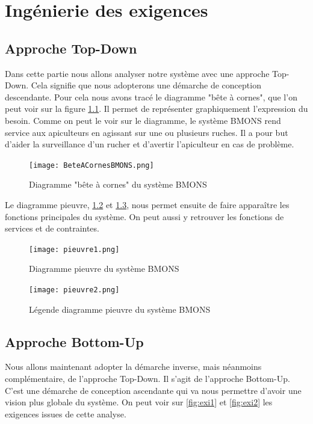 \chapter{Ingénierie des exigences}
\section{Approche Top-Down}
\vspace{1.5cm}
Dans cette partie nous allons analyser notre système avec une approche Top-Down. Cela signifie que nous adopterons une démarche de conception descendante. Pour cela nous avons tracé le diagramme "bête à cornes", que l'on peut voir sur la figure \ref{fig:beteacorne}. Il permet de représenter graphiquement l'expression du besoin. Comme on peut le voir sur le diagramme, le système BMONS rend service aux apiculteurs en agissant sur une ou plusieurs ruches. Il a pour but d'aider la surveillance d'un rucher et d'avertir l'apiculteur en cas de problème.


\begin{figure}[h!]
\centering\texttt{[image: BeteACornesBMONS.png]}
\caption{\label{fig:beteacorne} Diagramme "bête à cornes" du système BMONS}
\end{figure}

Le diagramme pieuvre, \ref{fig:diagpieuvre1} et \ref{fig:diagpieuvre2}, nous permet ensuite de faire apparaître les fonctions principales du système. On peut aussi y retrouver les fonctions de services et de contraintes.

 
\begin{figure}[h!]
\centering\texttt{[image: pieuvre1.png]}
\caption{\label{fig:diagpieuvre1} Diagramme pieuvre du système BMONS}
\end{figure}

\begin{figure}[h!]
\centering\texttt{[image: pieuvre2.png]}
\caption{\label{fig:diagpieuvre2} Légende diagramme pieuvre du système BMONS}
\end{figure}

\clearpage

\section{Approche Bottom-Up}

\vspace{1.5cm}
Nous allons maintenant adopter la démarche inverse, mais néanmoins complémentaire, de l'approche Top-Down. Il s'agit de l'approche Bottom-Up. C'est une démarche de conception ascendante qui va nous permettre d'avoir une vision plus globale du système. On peut voir sur \ref{fig:exi1} et \ref{fig:exi2} les exigences issues de cette analyse.


